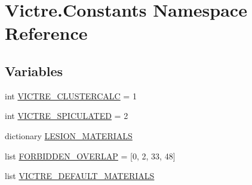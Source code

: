 \hypertarget{namespaceVictre_1_1Constants}{\section{Victre.\-Constants Namespace Reference}
\label{namespaceVictre_1_1Constants}
}
\subsection*{Variables}
\begin{DoxyCompactItemize}
\item 
int \hyperlink{namespaceVictre_1_1Constants_a77bdb782c53bfcba86298b9dbf9badf8}{V\-I\-C\-T\-R\-E\-\_\-\-C\-L\-U\-S\-T\-E\-R\-C\-A\-L\-C} = 1
\item 
int \hyperlink{namespaceVictre_1_1Constants_a958697a0c4859c6af5fa5b86ca200122}{V\-I\-C\-T\-R\-E\-\_\-\-S\-P\-I\-C\-U\-L\-A\-T\-E\-D} = 2
\item 
dictionary \hyperlink{namespaceVictre_1_1Constants_afb24053601d05cef5c08ba473c4aa6c6}{L\-E\-S\-I\-O\-N\-\_\-\-M\-A\-T\-E\-R\-I\-A\-L\-S}
\item 
list \hyperlink{namespaceVictre_1_1Constants_a4b0fc18a3a04131e2a58c169f0dbbbac}{F\-O\-R\-B\-I\-D\-D\-E\-N\-\_\-\-O\-V\-E\-R\-L\-A\-P} = \mbox{[}0, 2, 33, 48\mbox{]}
\item 
list \hyperlink{namespaceVictre_1_1Constants_a2ffc77ab0e4ac3a91b60dd45022fcdf1}{V\-I\-C\-T\-R\-E\-\_\-\-D\-E\-F\-A\-U\-L\-T\-\_\-\-M\-A\-T\-E\-R\-I\-A\-L\-S}
\end{DoxyCompactItemize}


